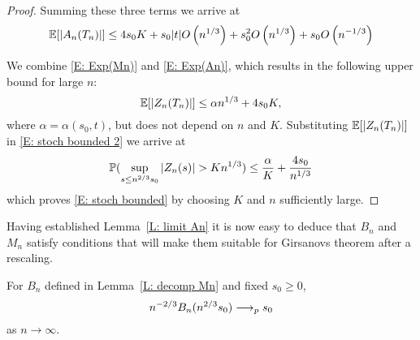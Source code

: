 \begin{proof}
    Summing these three terms we arrive at
    \begin{equation} \label{E: Exp(An)}
    \mathbb{E}[|A_n(T_n)|] \leq 4 s_0 K + s_0|t|O\left(n^{1 / 3}\right) + s_0^2O\left(n^{1 / 3}\right) + s_0O\left(n^{-1 / 3}\right)
    \end{equation}
    
    We combine \eqref{E: Exp(Mn)} and \eqref{E: Exp(An)}, 
    which results in the following upper bound for large $n$:
    \begin{equation} \label{E: bound Zn}
    \mathbb{E}[|Z_n(T_n)|] \leq \alpha n^{1 / 3} + 4s_0K,
    \end{equation}
    where $\alpha = \alpha(s_0,t)$, but does not depend on $n$ and $K$. 
    Substituting $\mathbb{E}[|Z_n(T_n)|]$ in \eqref{E: stoch bounded 2} we arrive at
    \begin{equation}
    \mathbb{P}( \sup_{s\leq n^{2/3} s_0} |Z_n(s)| > K n^{1 / 3} ) \leq \frac{\alpha}{K} + \frac{4s_0}{n^{1 / 3}}
    \end{equation}
    which proves \eqref{E: stoch bounded} by choosing $K$ and $n$ sufficiently large.
\end{proof}

Having established Lemma~\ref{L: limit An} it is now easy to deduce that $B_n$ and $M_n$ satisfy conditions 
that will make them suitable for Girsanovs theorem after a rescaling.

\begin{lemma} \label{L: limit Bn}
	For $B_n$ defined in Lemma~\ref{L: decomp Mn} and fixed $s_0 \geq 0$,
	\begin{equation} \label{E: limit Bn}
	n^{-2 / 3} B_n(n^{2 / 3}s_0) \longrightarrow_p s_0
	\end{equation}
	as $n \rightarrow \infty$.
\end{lemma}

